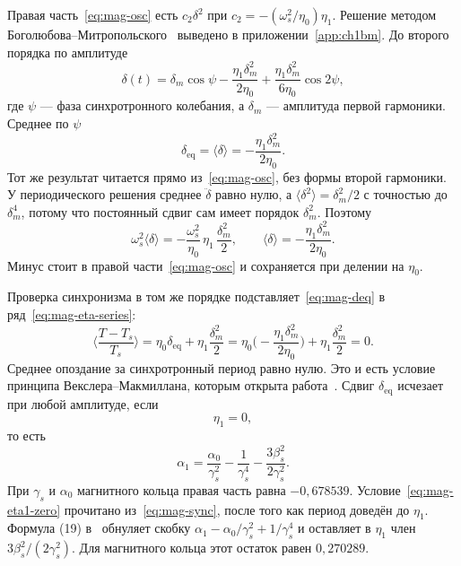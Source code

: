 \documentclass[aps,pra,preprint,a4paper,amsmath,amssymb,longbibliography]{revtex4-2}
\begin{document}
Правая часть~\eqref{eq:mag-osc} есть $c_2\delta^2$ при $c_2=-(\omega_s^2/\eta_0)\eta_1$. Решение методом Боголюбова--Митропольского~\cite{Bogoliubov1961} выведено в приложении~\ref{app:ch1bm}. До второго порядка по амплитуде
\begin{equation}
\label{eq:mag-delta-sol}
\delta(t)
=\delta_m\cos\psi
-\frac{\eta_1\delta_m^2}{2\eta_0}
+\frac{\eta_1\delta_m^2}{6\eta_0}\cos 2\psi,
\end{equation}
где $\psi$ --- фаза синхротронного колебания, а $\delta_m$ --- амплитуда первой гармоники. Среднее по $\psi$
\begin{equation}
\label{eq:mag-deq}
\delta_{\mathrm{eq}}
=\langle\delta\rangle
=-\frac{\eta_1\delta_m^2}{2\eta_0}.
\end{equation}
Тот же результат читается прямо из~\eqref{eq:mag-osc}, без формы второй гармоники. У периодического решения среднее $\ddot\delta$ равно нулю, а $\langle\delta^2\rangle=\delta_m^2/2$ с точностью до $\delta_m^4$, потому что постоянный сдвиг сам имеет порядок $\delta_m^2$. Поэтому
\begin{equation}
\label{eq:mag-average-osc}
\omega_s^2\langle\delta\rangle
=-\frac{\omega_s^2}{\eta_0}\,\eta_1\,\frac{\delta_m^2}{2},
\qquad
\langle\delta\rangle=-\frac{\eta_1\delta_m^2}{2\eta_0}.
\end{equation}
Минус стоит в правой части~\eqref{eq:mag-osc} и сохраняется при делении на $\eta_0$.

Проверка синхронизма в том же порядке подставляет~\eqref{eq:mag-deq} в ряд~\eqref{eq:mag-eta-series}:
\begin{equation}
\label{eq:mag-sync}
\Biggl\langle\frac{T-T_s}{T_s}\Biggr\rangle
=\eta_0\delta_{\mathrm{eq}}+\eta_1\frac{\delta_m^2}{2}
=\eta_0\Biggl(-\frac{\eta_1\delta_m^2}{2\eta_0}\Biggr)+\eta_1\frac{\delta_m^2}{2}
=0.
\end{equation}
Среднее опоздание за синхротронный период равно нулю. Это и есть условие принципа Векслера--Макмиллана, которым открыта работа~\cite{Senichev2013}. Сдвиг $\delta_{\mathrm{eq}}$ исчезает при любой амплитуде, если
\begin{equation}
\label{eq:mag-eta1-zero}
\eta_1=0,
\end{equation}
то есть
\begin{equation}
\label{eq:mag-alpha1-comp}
\alpha_1
=\frac{\alpha_0}{\gamma_s^2}-\frac{1}{\gamma_s^4}-\frac{3\beta_s^2}{2\gamma_s^2}.
\end{equation}
При $\gamma_s$ и $\alpha_0$ магнитного кольца правая часть равна $-0{,}678539$. Условие~\eqref{eq:mag-eta1-zero} прочитано из~\eqref{eq:mag-sync}, после того как период доведён до $\eta_1$. Формула (19) в~\cite{Senichev2013} обнуляет скобку $\alpha_1-\alpha_0/\gamma_s^2+1/\gamma_s^4$ и оставляет в $\eta_1$ член $3\beta_s^2/(2\gamma_s^2)$. Для магнитного кольца этот остаток равен $0{,}270289$.
\end{document}

